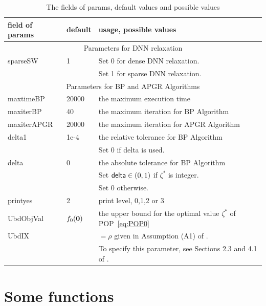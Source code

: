 \documentclass[12pt]{article}
\def\0{\mbox{\bf 0}}
\begin{document}
\begin{table}[htp]
\caption{The fields of {\sf params}, default values and possible values}
\begin{center}
\begin{tabular}{|l|l|l|} \hline
field of {\sf params} & default &  usage, possible values\\
\hline
\multicolumn{3}{|c|}{Parameters for DNN relaxation} \\ 
\hline 
{\sf sparseSW}   & 1 & Set 0 for dense DNN relaxation. \\
                           &    & Set 1 for sparse DNN relaxation. \\
\hline
\multicolumn{3}{|c|}{Parameters for BP and APGR Algorithms} \\ 
\hline
{\sf maxtimeBP }  & 20000 & the maximum execution time\\
\hline
{\sf maxiterBP} & 40 & the maximum iteration  for BP Algorithm \\
\hline
{\sf maxiterAPGR}  & 20000 & the maximum iteration for APGR Algorithm \\
\hline
{\sf delta1}  & 1e-4 & the relative tolerance for BP Algorithm\\
                             &    & Set $0$ if {\sf delta} is used. \\
\hline
{\sf delta}  & 0 & the absolute tolerance  for BP Algorithm \\
                         &    & Set  ${\sf delta} \in (0,1)$ if $\zeta^*$ is integer. \\
                         &    & Set $0$ otherwise. \\
\hline
{\sf printyes}  & 2 & print level, 0,1,2 or 3 \\  
\hline                        
{\sf UbdObjVal}   & $f_0(\0)$   & the upper bound %
for the optimal value $\zeta^*$ of POP~\eqref{eq:POP0} \\
\hline
{\sf UbdIX}          &         & $= \rho$ given in Assumption (A1) of \cite{ITO2018}.\\
                     &         & To specify this parameter, see Sections 2.3 and 4.1 of \cite{ITO2018}. \\
\hline
\end{tabular}
\end{center}
\label{tableOfparam}
\end{table}


%
\section{Some functions}
\end{document}
